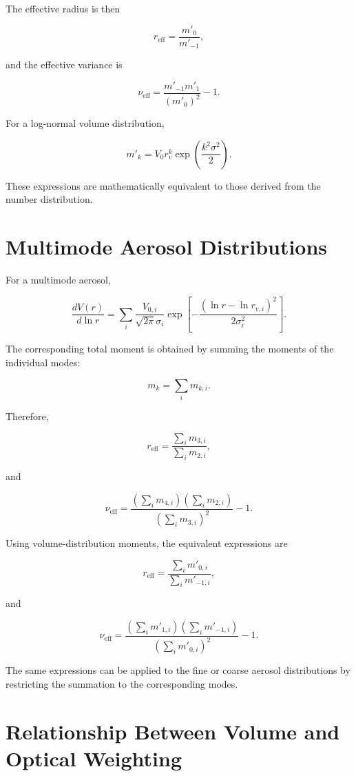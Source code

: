 \documentclass[
  11pt,
  letterpaper,
]{scrreprt}
\begin{document}
The effective radius is then

\[
r_{\mathrm{eff}}
=
\frac{m'_0}{m'_{-1}},
\]

and the effective variance is

\[
\nu_{\mathrm{eff}}
=
\frac{
m'_{-1}m'_1
}{
(m'_0)^2
}
-1.
\]

For a log-normal volume distribution,

\[
m'_k
=
V_0
r_v^k
\exp
\left(
\frac{k^2\sigma^2}{2}
\right).
\]

These expressions are mathematically equivalent to those derived from
the number distribution.

\section{Multimode Aerosol
Distributions}\label{multimode-aerosol-distributions}

For a multimode aerosol,

\[
\frac{dV(r)}{d\ln r}
=
\sum_i
\frac{V_{0,i}}{\sqrt{2\pi}\sigma_i}
\exp
\left[
-\frac{(\ln r-\ln r_{v,i})^2}
{2\sigma_i^2}
\right].
\]

The corresponding total moment is obtained by summing the moments of the
individual modes:

\[
m_k
=
\sum_i m_{k,i}.
\]

Therefore,

\[
r_{\mathrm{eff}}
=
\frac{
\sum_i m_{3,i}
}{
\sum_i m_{2,i}
},
\]

and

\[
\nu_{\mathrm{eff}}
=
\frac{
\left(\sum_i m_{4,i}\right)
\left(\sum_i m_{2,i}\right)
}{
\left(\sum_i m_{3,i}\right)^2
}
-1.
\]

Using volume-distribution moments, the equivalent expressions are

\[
r_{\mathrm{eff}}
=
\frac{
\sum_i m'_{0,i}
}{
\sum_i m'_{-1,i}
},
\]

and

\[
\nu_{\mathrm{eff}}
=
\frac{
\left(\sum_i m'_{1,i}\right)
\left(\sum_i m'_{-1,i}\right)
}{
\left(\sum_i m'_{0,i}\right)^2
}
-1.
\]

The same expressions can be applied to the fine or coarse aerosol
distributions by restricting the summation to the corresponding modes.

\section{Relationship Between Volume and Optical
Weighting}\label{relationship-between-volume-and-optical-weighting}
\end{document}
